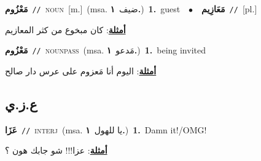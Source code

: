 \documentclass[10pt,a4paper,twoside]{article} %
\begin{document}
\begin{multicols}{2}
{\setlength\topsep{0pt}\textbf{\foreignlanguage{arabic}{مَعْزُوم}}\ {\color{gray}\texttt{//}\color{black}}\ \textsc{noun}\ [m.]\ \color{gray}(msa. \foreignlanguage{arabic}{ضيف}~\foreignlanguage{arabic}{\textbf{١.}})\color{black}\ \textbf{1.}~guest\ \ $\bullet$\ \ \setlength\topsep{0pt}\textbf{\foreignlanguage{arabic}{مَعَازِيم}}\ {\color{gray}\texttt{//}\color{black}}\ [pl.]\  \begin{flushright}\color{gray}\foreignlanguage{arabic}{\textbf{\underline{\foreignlanguage{arabic}{أمثلة}}}: كان مبخوع من كثر المعازيم}\end{flushright}\color{black}} \vspace{2mm}

{\setlength\topsep{0pt}\textbf{\foreignlanguage{arabic}{مَعْزُوم}}\ {\color{gray}\texttt{//}\color{black}}\ \textsc{noun\textunderscore pass}\ \color{gray}(msa. \foreignlanguage{arabic}{مَدعو}~\foreignlanguage{arabic}{\textbf{١.}})\color{black}\ \textbf{1.}~being invited\  \begin{flushright}\color{gray}\foreignlanguage{arabic}{\textbf{\underline{\foreignlanguage{arabic}{أمثلة}}}: اليوم أنا مَعزوم على عرس دار صالح}\end{flushright}\color{black}} \vspace{2mm}

\vspace{-3mm}
\subsection*{\color{blue}\foreignlanguage{arabic}{ع.ز.ي}\color{blue}{}} 

{\setlength\topsep{0pt}\textbf{\foreignlanguage{arabic}{عَزَا}}\ {\color{gray}\texttt{//}\color{black}}\ \textsc{interj}\ \color{gray}(msa. \foreignlanguage{arabic}{يا للهول}~\foreignlanguage{arabic}{\textbf{١.}})\color{black}\ \textbf{1.}~Damn it!/OMG!\  \begin{flushright}\color{gray}\foreignlanguage{arabic}{\textbf{\underline{\foreignlanguage{arabic}{أمثلة}}}: عزا!!! شو جابك هون ؟}\end{flushright}\color{black}} \vspace{2mm}


\end{multicols}
\end{document}
